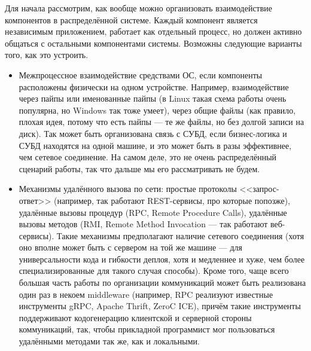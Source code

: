 \documentclass[a5paper]{article}
\begin{document}
Для начала рассмотрим, как вообще можно организовать взаимодействие компонентов в распределённой системе. Каждый компонент является независимым приложением, работает как отдельный процесс, но должен активно общаться с остальными компонентами системы. Возможны следующие варианты того, как это устроить.

\begin{itemize}
    \item Межпроцессное взаимодействие средствами ОС, если компоненты расположены физически на одном устройстве. Например, взаимодействие через пайпы или именованные пайпы (в Linux такая схема работы очень популярна, но Windows так тоже умеет), через общие файлы (как правило, плохая идея, потому что есть пайпы --- те же файлы, но без долгой записи на диск). Так может быть организована связь с СУБД, если бизнес-логика и СУБД находятся на одной машине, и это может быть в разы эффективнее, чем сетевое соединение. На самом деле, это не очень распределённый сценарий работы, так что дальше мы его рассматривать не будем.
    \item Механизмы удалённого вызова по сети: простые протоколы <<запрос-ответ>> (например, так работают REST-сервисы, про которые попозже), удалённые вызовы процедур (RPC, Remote Procedure Calls), удалённые вызовы методов (RMI, Remote Method Invocation --- так работают веб-сервисы). Такие механизмы предполагают наличие сетевого соединения (хотя оно вполне может быть с сервером на той же машине --- для универсальности кода и гибкости деплоя, хотя и медленнее и хуже, чем более специализированные для такого случая способы). Кроме того, чаще всего большая часть работы по организации коммуникаций может быть реализована один раз в некоем middleware (например, RPC реализуют известные инструменты gRPC, Apache Thrift, ZeroC ICE), причём такие инструменты поддерживают кодогенерацию клиентской и серверной стороны коммуникаций, так, чтобы прикладной программист мог пользоваться удалёнными методами так же, как и локальными.

\end{itemize}
\end{document}
